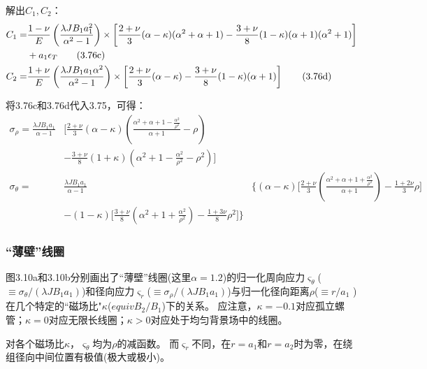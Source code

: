 解出$C_1,C_2$：
\begin{align*}
C_1=&\frac{1-\nu}{E}\left(\frac{\lambda JB_1a_1^2}{\alpha^2-1}\right)
\times\left[\frac{2+\nu}{3}(\alpha-\kappa)(\alpha^2+\alpha+1)
-\frac{3+\nu}{8}(1-\kappa)(\alpha+1)(\alpha^2+1)\right] \notag\\
&+a_1\epsilon_T\tag{3.76c}\\
C_2=&\frac{1+\nu}{E}\left(\frac{\lambda JB_1a_1\alpha^2}{\alpha^2-1}\right)\times \left[\frac{2+\nu}{3}(\alpha-\kappa)-\frac{3+\nu}{8}(1-\kappa)(\alpha+1)\right]\tag{3.76d}
\end{align*}

将3.76c和3.76d代入3.75，可得：
\begin{subequations}
	\begin{align}
\sigma_\rho=\frac{\lambda JB_1a_1}{\alpha-1}&\bigg[\frac{2+\nu}{3}(\alpha-\kappa)\left(\frac{\alpha^2+\alpha+1-\frac{\alpha^2}{\rho^2}}{\alpha+1}-\rho\right) \\ \nonumber
&-\frac{3+\nu}{8}(1+\kappa)\left(\alpha^2+1-\frac{\alpha^2}{\rho^2}-\rho^2\right)\bigg]\\
\sigma_\theta=&\frac{\lambda JB_1a_1}{\alpha-1}&\bigg\{(\alpha-\kappa)\big[\frac{2+\nu}{3}\left(\frac{\alpha^2+\alpha+1+{\frac{\alpha^2}{\rho^2}}}{\alpha+1}\right)-\frac{1+2\nu}{3}\rho\big] \\ \nonumber
&-(1-\kappa)\big[\frac{3+\nu}{8}\left(\alpha^2+1+\frac{\alpha^2}{\rho^2}\right)-\frac{1+3\nu}{8}\rho^2\big]\bigg\}
	\end{align}
\end{subequations}

\subsubsection{``薄壁''线圈}
图3.10a和3.10b分别画出了``薄壁''线圈(这里$\alpha=1.2$)的归一化周向应力$\varsigma_\theta$($\equiv \sigma_{\theta}/(\lambda J B_1 a_1)$)和径向应力$\varsigma_r$($\equiv \sigma_{\rho}/(\lambda J B_1 a_1)$)与归一化径向距离$\rho$($\equiv r/a_1$ )在几个特定的``磁场比"$\kappa$($equiv B_2/B_1$)下的关系。
应注意，$\kappa=-0.1$对应孤立螺管；$\kappa=0$对应无限长线圈；$\kappa>0$对应处于均匀背景场中的线圈。

对各个磁场比$\kappa$，$\varsigma_\theta$均为$\rho$的减函数。
而$\varsigma_r$不同，在$r=a_1$和$r=a_2$时为零，在绕组径向中间位置有极值(极大或极小)。

